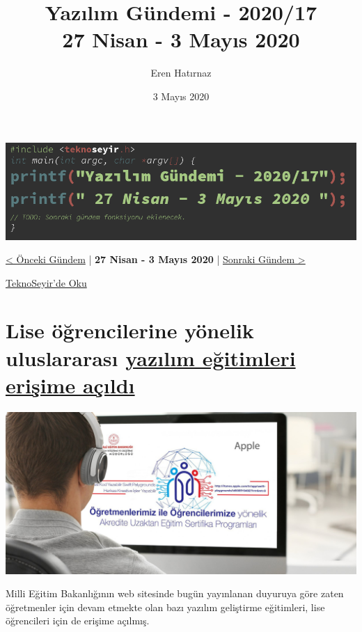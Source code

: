 \documentclass[11pt]{article}
\author{Eren Hatırnaz}
\date{3 Mayıs 2020}
\title{Yazılım Gündemi - 2020/17\\\medskip
\large 27 Nisan - 3 Mayıs 2020}
\begin{document}
\maketitle
\tableofcontents \clearpage\shorthandoff{=}

\begin{center}
\includegraphics[width=.9\linewidth]{gorseller/yazilim-gundemi-banner.png}
\end{center}

\begin{center}
\href{../16/yazilim-gundemi-2020-16.pdf}{< Önceki Gündem} | \textbf{27 Nisan - 3 Mayıs 2020} | \href{../18/yazilim-gundemi-2020-18.pdf}{Sonraki Gündem >}

\href{https://teknoseyir.com/blog/yazilim-gundemi-2020-17}{TeknoSeyir'de Oku}
\end{center}

\section{Lise öğrencilerine yönelik uluslararası \href{http://meb.gov.tr/lise-ogrencilerine-yonelik-uluslararasi-yazilim-egitimleri-erisime-acildi/haber/20834/tr}{yazılım eğitimleri erişime açıldı}}
\label{sec:org199fd0b}
\begin{center}
\includegraphics[width=.9\linewidth]{gorseller/meb-yazilim-egitim.png}
\end{center}

Milli Eğitim Bakanlığının web sitesinde bugün yayınlanan duyuruya göre zaten
öğretmenler için devam etmekte olan bazı yazılım geliştirme eğitimleri, lise
öğrencileri için de erişime açılmış.
\end{document}
